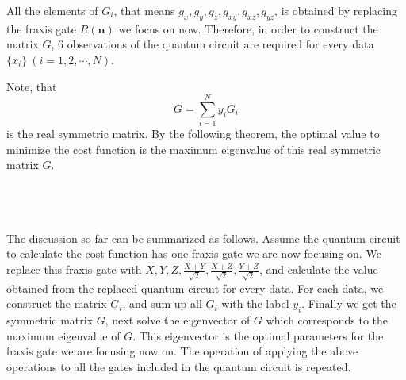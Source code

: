 \par All the elements of $G_i$, that means $g_x, g_y, g_z, g_{xy}, g_{xz}, g_{yz}$, is obtained by replacing the fraxis gate $R(\bm{n})$ we focus on now. Therefore, in order to construct the matrix $G$, 6 observations of the quantum circuit are required for every data $\{x_i\}\ (i=1,2,\cdots, N)$.
\par Note, that 
$$G=\sum_{i=1}^N  y_{i}G_{i}$$
is the real symmetric matrix. By the following theorem, the optimal value to minimize the cost function is the maximum eigenvalue of this real symmetric matrix $G$.


\\
\\
\\
The discussion so far can be summarized as follows. Assume the quantum circuit to calculate the cost function has one fraxis gate we are now focusing on. We replace this fraxis gate with $X, Y, Z, \frac{X+Y}{\sqrt2}, \frac{X+Z}{\sqrt2}, \frac{Y+Z}{\sqrt2}$, and calculate the value obtained from the replaced quantum circuit for every data. For each data, we construct the matrix $G_i$, and sum up all $G_i$ with the label $y_i$. Finally we get the symmetric matrix $G$, next solve the eigenvector of $G$ which corresponds to the maximum eigenvalue of $G$. This eigenvector is the optimal parameters for the fraxis gate we are focusing now on. The operation of applying the above operations to all the gates included in the quantum circuit is repeated.